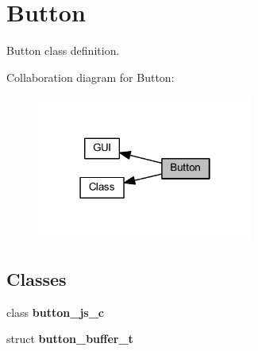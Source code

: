 \section{Button}
\label{group___button}


Button class definition.  


Collaboration diagram for Button\+:
\nopagebreak
\begin{figure}[H]
\begin{center}
\leavevmode
\includegraphics[width=202pt]{group___button}
\end{center}
\end{figure}
\subsection*{Classes}
\begin{DoxyCompactItemize}
\item 
class \textbf{ button\+\_\+js\+\_\+c}
\item 
struct \textbf{ button\+\_\+buffer\+\_\+t}
\end{DoxyCompactItemize}
